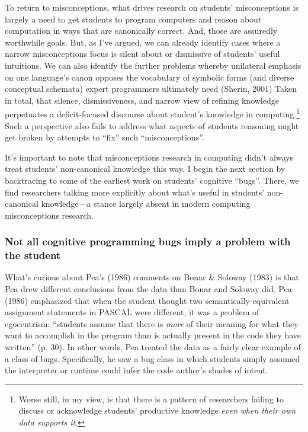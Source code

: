 To return to misconceptions, what drives research on students'
misconceptions is largely a need to get students to program computers
and reason about computation in ways that are canonically correct. And,
those are assuredly worthwhile goals. But, as I've argued, we can
already identify cases where a narrow misconceptions focus is silent
about or dismissive of students' useful intuitions. We can also identify
the further problems whereby unilateral emphasis on one language's canon
opposes the vocabulary of symbolic forms (and diverse conceptual
schemata) expert programmers ultimately need (Sherin, 2001) Taken in
total, that silence, dismissiveness, and narrow view of refining
knowledge perpetuates a deficit-focused discourse about student's
knowledge in computing.\footnote{Worse still, in my view, is that there
  is a pattern of researchers failing to discuss or acknowledge
  students' productive knowledge \emph{even when their own data supports
  it}.} Such a perspective also fails to address what aspects of
students reasoning might get broken by attempts to ``fix'' such
``misconceptions''.

It's important to note that misconceptions research in computing didn't
always treat students' non-canonical knowledge this way. I begin the
next section by backtracing to some of the earliest work on students'
cognitive ``bugs''. There, we find researchers talking more explicitly
about what's useful in students' non-canonical knowledge---a stance
largely absent in modern computing misconceptions research.

\subsubsection{Not all cognitive programming bugs imply a problem with
the
student}\label{not-all-cognitive-programming-bugs-imply-a-problem-with-the-student}

What's curious about Pea's (1986) comments on Bonar \& Soloway (1983) is
that Pea drew different conclusions from the data than Bonar and Soloway
did. Pea (1986) emphasized that when the student thought two
semantically-equivalent assignment statements in PASCAL were different,
it was a problem of egocentrism: ``students assume that there is
\emph{more} of their meaning for what they want to accomplish in the
program than is actually present in the code they have written'' (p.
30). In other words, Pea treated the data as a fairly clear example of a
class of bugs. Specifically, he saw a bug class in which students simply
assumed the interpreter or runtime could infer the code author's shades
of intent.

